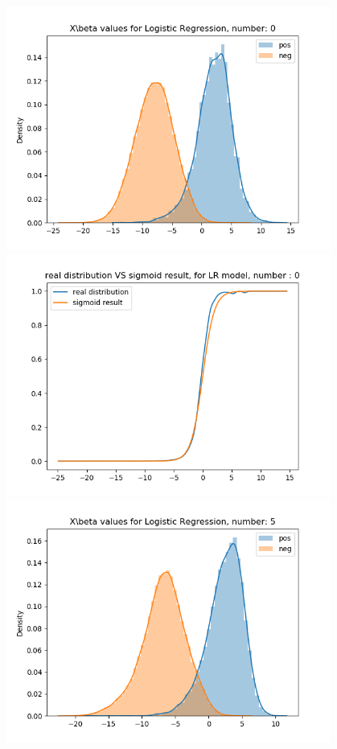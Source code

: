 \documentclass{article}
\begin{document}
\begin{figure}[H]
    \centering
    \begin{minipage}{0.19\textwidth}
        \centering
        \includegraphics[width=0.95\textwidth]{fig/lr/0.png}
        \includegraphics[width=0.95\textwidth]{fig/lr/0-2.png}
        \includegraphics[width=0.95\textwidth]{fig/lr/5.png}

\end{minipage}
\end{figure}
\end{document}
